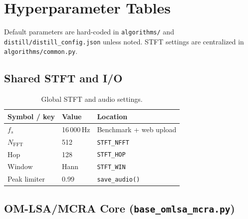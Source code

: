 \chapter{Hyperparameter Tables}
\label{app:hyperparams}

Default parameters are hard-coded in \texttt{algorithms/} and \texttt{distill/distill\_config.json} unless noted. STFT settings are centralized in \texttt{algorithms/common.py}.

\section{Shared STFT and I/O}
\label{app:stft}

\begin{table}[H]
  \centering
  \caption{Global STFT and audio settings.}
  \label{tab:hp_stft}
  \begin{tabular}{lll}
    \toprule
    \textbf{Symbol / key} & \textbf{Value} & \textbf{Location} \\
    \midrule
    $f_s$                   & 16\,000\,Hz & Benchmark + web upload \\
    $N_{\mathrm{FFT}}$      & 512         & \texttt{STFT\_NFFT} \\
    Hop                     & 128         & \texttt{STFT\_HOP} \\
    Window                  & Hann        & \texttt{STFT\_WIN} \\
    Peak limiter            & 0.99        & \texttt{save\_audio()} \\
    \bottomrule
  \end{tabular}
\end{table}

\section{OM-LSA/MCRA Core (\texttt{base\_omlsa\_mcra.py})}
\label{app:omlsa}

